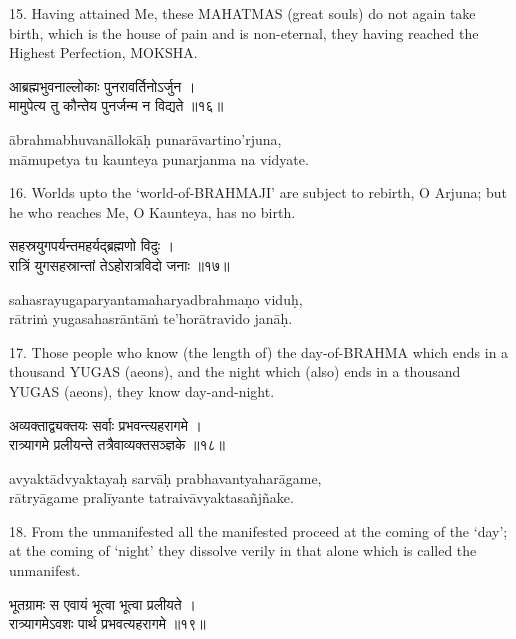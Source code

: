 15. Having attained Me, these MAHATMAS (great souls) do not again take birth,
which is the house of pain and is non-eternal, they having reached the Highest
Perfection, MOKSHA.\@

\begin{gitaverse}
आब्रह्मभुवनाल्लोकाः पुनरावर्तिनोऽर्जुन । \\
मामुपेत्य तु कौन्तेय पुनर्जन्म न विद्यते ॥१६॥
\end{gitaverse}

\begin{transliteration}
ābrahmabhuvanāllokāḥ punarāvartino'rjuna, \\
māmupetya tu kaunteya punarjanma na vidyate.
\end{transliteration}

16. Worlds upto the `world-of-BRAHMAJI' are subject to rebirth, O Arjuna; but
he who reaches Me, O Kaunteya, has no birth.

\begin{gitaverse}
सहस्रयुगपर्यन्तमहर्यद्ब्रह्मणो विदुः । \\
रात्रिं युगसहस्रान्तां तेऽहोरात्रविदो जनाः ॥१७॥
\end{gitaverse}

\begin{transliteration}
sahasrayugaparyantamaharyadbrahmaṇo viduḥ, \\
rātriṁ yugasahasrāntāṁ te'horātravido janāḥ.
\end{transliteration}

17. Those people who know (the length of) the day-of-BRAHMA which ends in a
thousand YUGAS (aeons), and the night which (also) ends in a thousand YUGAS
(aeons), they know day-and-night.

\begin{gitaverse}
अव्यक्ताद्व्यक्तयः सर्वाः प्रभवन्त्यहरागमे । \\
रात्र्यागमे प्रलीयन्ते तत्रैवाव्यक्तसञ्ज्ञके ॥१८॥
\end{gitaverse}

\begin{transliteration}
avyaktādvyaktayaḥ sarvāḥ prabhavantyaharāgame, \\
rātryāgame pralīyante tatraivāvyaktasañjñake.
\end{transliteration}

18. From the unmanifested all the manifested proceed at the coming of the
`day'; at the coming of `night' they dissolve verily in that alone which is
called the unmanifest.

\begin{gitaverse}
भूतग्रामः स एवायं भूत्वा भूत्वा प्रलीयते । \\
रात्र्यागमेऽवशः पार्थ प्रभवत्यहरागमे ॥१९॥
\end{gitaverse}


